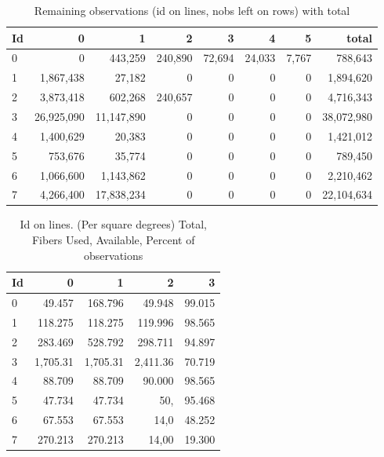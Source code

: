 \documentclass{article}
\begin{document}
 
\begin{table}[h]\begin{center}
\caption{Remaining observations (id on lines, nobs left on rows) with total}\label{tab:full14k}
\begin{tabular}{l|rrrrrrr}
	Id &      0  &           1  &           2  &           3  &           4  &           5  & total\\ \hline
   0  &           0  &     443,259  &     240,890  &      72,694  &      24,033  &       7,767  &     788,643\\
   1  &   1,867,438  &      27,182  &           0  &           0  &           0  &           0  &   1,894,620\\
   2  &   3,873,418  &     602,268  &     240,657  &           0  &           0  &           0  &   4,716,343\\
   3  &  26,925,090  &  11,147,890  &           0  &           0  &           0  &           0  &  38,072,980\\
   4  &   1,400,629  &      20,383  &           0  &           0  &           0  &           0  &   1,421,012\\
   5  &     753,676  &      35,774  &           0  &           0  &           0  &           0  &     789,450\\
   6  &   1,066,600  &   1,143,862  &           0  &           0  &           0  &           0  &   2,210,462\\
   7  &   4,266,400  &  17,838,234  &           0  &           0  &           0  &           0  &  22,104,634\\
\end{tabular}\end{center}
 \end{table}


\begin{table}[h]\begin{center}
\caption{Id on lines. (Per square degrees) Total, Fibers Used, Available, Percent of observations}
\begin{tabular}{l|rrrr} 
	Id &          0  &           1  &           2  &           3 \\ \hline
   0  &      49.457  &     168.796  &      49.948  &      99.015   \\
   1  &     118.275  &     118.275  &     119.996  &      98.565   \\
   2  &     283.469  &     528.792  &     298.711  &      94.897   \\
   3  &    1,705.31  &    1,705.31  &    2,411.36  &      70.719   \\
   4  &      88.709  &      88.709  &      90.000  &      98.565   \\
   5  &      47.734  &      47.734  &         50,  &      95.468   \\
   6  &      67.553  &      67.553  &        14,0  &      48.252   \\
   7  &     270.213  &     270.213  &       14,00  &      19.300   \\
\end{tabular}\end{center}
 \end{table}
\end{document}
